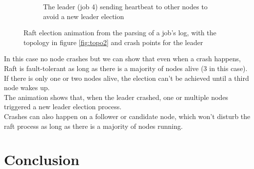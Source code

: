 \documentclass{eplmastersthesis}
\begin{document}
\begin{figure}[H]
\begin{subfigure}{.45\textwidth}
            \caption{The leader (job 4) sending heartbeat to other nodes to avoid a new leader election}
            \label{fig:ele4}
          \end{subfigure}

          \caption{Raft election animation from the parsing of a job's log, with the topology in figure \ref{fig:topo2}
          and crash points for the leader}
          \label{fig:election}
        \end{figure}

        In this case no node crashes but we can show that even when a crash
        happens, Raft is fault-tolerant as long as there is a majority of
        nodes alive (3 in this case). If there is only one or two nodes alive,
        the election can't be achieved until a third node wakes up.\\
        The animation shows that, when the leader crashed, one or multiple
        nodes triggered a new leader election process.\\
        Crashes can also happen on a follower or candidate node, which won't
        disturb the raft process as long as there is a majority of nodes
        running.





  \chapter{Conclusion}
\end{document}
